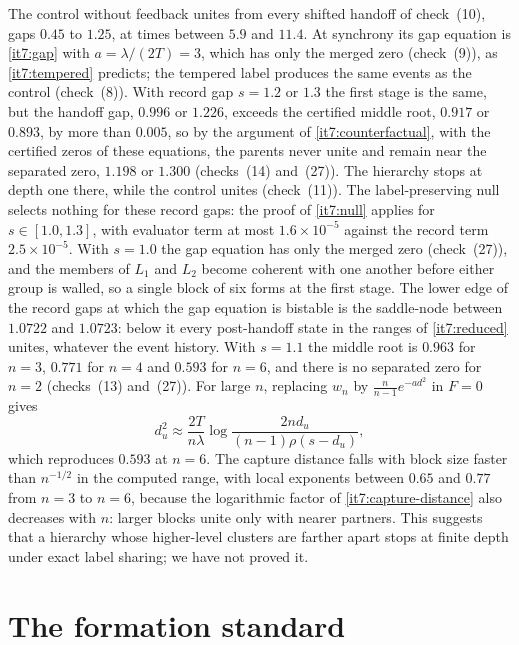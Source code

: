 \documentclass[11pt,letterpaper]{report}
\begin{document}
The control without feedback unites from every shifted handoff of check~(10), gaps $0.45$ to $1.25$, at times between $5.9$ and $11.4$. At synchrony its gap equation is \cref{it7:gap} with $a=\lambda/(2T)=3$, which has only the merged zero (check~(9)), as \cref{it7:tempered} predicts; the tempered label produces the same events as the control (check~(8)). With record gap $s=1.2$ or $1.3$ the first stage is the same, but the handoff gap, $0.996$ or $1.226$, exceeds the certified middle root, $0.917$ or $0.893$, by more than $0.005$, so by the argument of \cref{it7:counterfactual}, with the certified zeros of these equations, the parents never unite and remain near the separated zero, $1.198$ or $1.300$ (checks~(14) and~(27)). The hierarchy stops at depth one there, while the control unites (check~(11)). The label-preserving null selects nothing for these record gaps: the proof of \cref{it7:null} applies for $s\in[1.0,1.3]$, with evaluator term at most $1.6\times10^{-5}$ against the record term $2.5\times10^{-5}$. With $s=1.0$ the gap equation has only the merged zero (check~(27)), and the members of $L_1$ and $L_2$ become coherent with one another before either group is walled, so a single block of six forms at the first stage. The lower edge of the record gaps at which the gap equation is bistable is the saddle-node between $1.0722$ and $1.0723$: below it every post-handoff state in the ranges of \cref{it7:reduced} unites, whatever the event history. With $s=1.1$ the middle root is $0.963$ for $n=3$, $0.771$ for $n=4$ and $0.593$ for $n=6$, and there is no separated zero for $n=2$ (checks~(13) and~(27)). For large $n$, replacing $w_n$ by $\frac n{n-1}e^{-ad^2}$ in $F=0$ gives
\begin{equation}
d_u^2\approx\frac{2T}{n\lambda}\log\frac{2nd_u}{(n-1)\rho(s-d_u)},
\label{it7:capture-distance}
\end{equation}
which reproduces $0.593$ at $n=6$. The capture distance falls with block size faster than $n^{-1/2}$ in the computed range, with local exponents between $0.65$ and $0.77$ from $n=3$ to $n=6$, because the logarithmic factor of \cref{it7:capture-distance} also decreases with $n$: larger blocks unite only with nearer partners. This suggests that a hierarchy whose higher-level clusters are farther apart stops at finite depth under exact label sharing; we have not proved it.

\chapter{The formation standard}
\label{it7:ch-standard}
\end{document}
